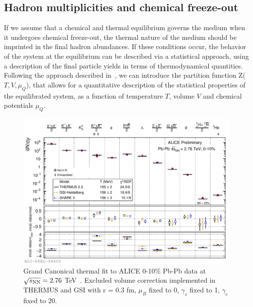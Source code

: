 \subsection{Hadron multiplicities and chemical freeze-out}
\label{sec:chemFO}
If we assume that a chemical and thermal equilibrium governs the medium when it
 undergoes chemical freeze-out, the thermal nature of the medium 
 should be imprinted in the final hadron abundances. 
 If these conditions occur, the behavior of the system at the 
 equilibrium can be described via a statistical approach, using a description 
 of the final particle yields in terms of thermodynamical quantities. 
 Following the approach described in~\cite{BraunMunzinger:2003zd}, 
 we can introduce the partition function Z($T,V,\mu_{Q}$), that 
 allows for a quantitative description of the statistical properties 
 of the equilibrated system, as a function of temperature $T$, 
 volume $V$ and chemical potentials $\mu_{Q}$. 
\begin{figure}[!ht]
  \centering
  \includegraphics[width=12cm]{FigCap1/GCThermalFit_PbPb010.pdf}
  \caption{Grand Canonical thermal fit to ALICE 0-10\% Pb-Pb data at $\sqrt{s_{\rm NN}} = 2.76$ TeV~\cite{Floris:2014pta}. Excluded volume correction implemented in THERMUS and GSI with r = 0.3 fm, $\mu_{B}$ fixed to 0, $\gamma_{s}$ fixed to 1, $\gamma_{c}$ fixed to 20. }
  \label{fig:GCThermalFit_PbPb010}
\end{figure}

